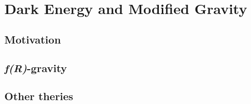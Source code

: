 \chapter{Dark Energy and Modified Gravity}

\section{Motivation}

\section{\textit{f(R)}-gravity}



\section{Other theries}
